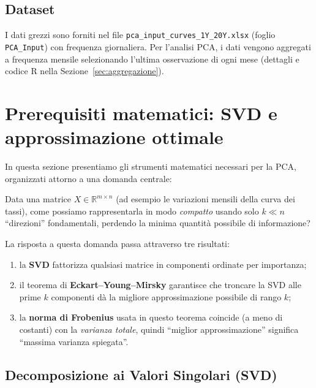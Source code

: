\documentclass[11pt,a4paper]{article}
\theoremstyle{plain}
\theoremstyle{definition}
\theoremstyle{remark}
\begin{document}
\subsection{Dataset}

I dati grezzi sono forniti nel file \texttt{pca\_input\_curves\_1Y\_20Y.xlsx}
(foglio \texttt{PCA\_Input}) con frequenza giornaliera. Per l'analisi PCA,
i dati vengono aggregati a frequenza mensile selezionando l'ultima osservazione
di ogni mese (dettagli e codice R nella Sezione~\ref{sec:aggregazione}).

\section{Prerequisiti matematici: SVD e approssimazione ottimale}

In questa sezione presentiamo gli strumenti matematici necessari per la PCA,
organizzati attorno a una domanda centrale:

\begin{keybox}
Data una matrice $X \in \mathbb{R}^{m \times n}$ (ad esempio le variazioni
mensili della curva dei tassi), come possiamo rappresentarla in modo
\emph{compatto} usando solo $k \ll n$ ``direzioni'' fondamentali, perdendo
la minima quantità possibile di informazione?
\end{keybox}

La risposta a questa domanda passa attraverso tre risultati:
\begin{enumerate}
  \item la \textbf{SVD} fattorizza qualsiasi matrice in componenti ordinate
        per importanza;
  \item il teorema di \textbf{Eckart--Young--Mirsky} garantisce che troncare
        la SVD alle prime $k$ componenti dà la migliore approssimazione
        possibile di rango $k$;
  \item la \textbf{norma di Frobenius} usata in questo teorema coincide
        (a meno di costanti) con la \emph{varianza totale}, quindi
        ``miglior approssimazione'' significa ``massima varianza spiegata''.
\end{enumerate}

\medskip

\subsection{Decomposizione ai Valori Singolari (SVD)}
\end{document}
